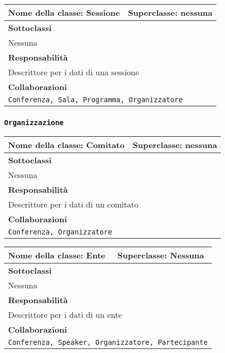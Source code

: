 \begin{table}[h!]
\centering
\begin{tabular}{|l|l|}
\hline
\textbf{Nome della classe:} Sessione & \textbf{Superclasse}: nessuna \\ \hline
\multicolumn{2}{|l|}{\textbf{Sottoclassi}}\\
\multicolumn{2}{|l|}{Nessuna} \\ \hline
\multicolumn{2}{|l|}{\textbf{Responsabilità}}\\
\multicolumn{2}{|l|}{Descrittore per i dati di una sessione} \\ \hline
\multicolumn{2}{|l|}{\textbf{Collaborazioni}}\\
\multicolumn{2}{|l|}{\texttt{Conferenza, Sala, Programma, Organizzatore}} \\ \hline
\end{tabular}
\end{table}

\newpage
\subsubsection{\texttt{Organizzazione}}
\begin{table}[h!]
\centering
\begin{tabular}{|l|l|}
\hline
\textbf{Nome della classe:} Comitato & \textbf{Superclasse}: nessuna \\ \hline
\multicolumn{2}{|l|}{\textbf{Sottoclassi}}\\
\multicolumn{2}{|l|}{Nessuna} \\ \hline
\multicolumn{2}{|l|}{\textbf{Responsabilità}}\\
\multicolumn{2}{|l|}{Descrittore per i dati di un comitato} \\ \hline
\multicolumn{2}{|l|}{\textbf{Collaborazioni}}\\
\multicolumn{2}{|l|}{\texttt{Conferenza, Organizzatore}} \\ \hline
\end{tabular}
\end{table}

\begin{table}[h!]
\centering
\begin{tabular}{|l|l|}
\hline
\textbf{Nome della classe:} Ente & \textbf{Superclasse}: Nessuna \\ \hline
\multicolumn{2}{|l|}{\textbf{Sottoclassi}}\\
\multicolumn{2}{|l|}{Nessuna} \\ \hline
\multicolumn{2}{|l|}{\textbf{Responsabilità}}\\
\multicolumn{2}{|l|}{Descrittore per i dati di un ente} \\ \hline
\multicolumn{2}{|l|}{\textbf{Collaborazioni}}\\
\multicolumn{2}{|l|}{\texttt{Conferenza, Speaker, Organizzatore, Partecipante}} \\ \hline
\end{tabular}
\end{table}

